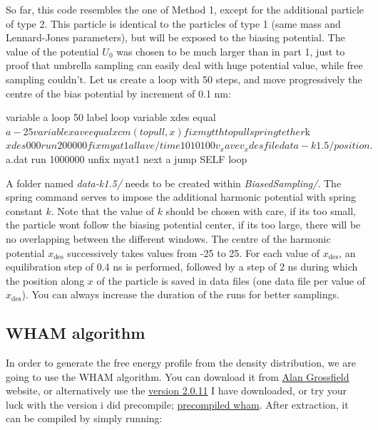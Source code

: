 \noindent So far, this code resembles the one of Method 1,
except for the additional particle of type 2. This
particle is identical to the particles of type 1 (same
mass and Lennard-Jones parameters), but will be exposed to the
biasing potential.
The value of the potential $U_0$ was chosen to be much larger than in part 1, 
just to proof that umbrella sampling can easily deal with huge potential value,
while free sampling couldn't.
Let us create a loop with 50 steps, and move progressively
the centre of the bias potential by increment of 0.1 nm:

\begin{lcverbatim}
variable a loop 50
label loop
variable xdes equal ${a}-25
variable xave equal xcm(topull,x)
fix mytth topull spring tether ${k} ${xdes} 0 0 0
run 200000
fix myat1 all ave/time 10 10 100 v_xave v_xdes file data-k1.5/position.${a}.dat
run 1000000
unfix myat1
next a
jump SELF loop
\end{lcverbatim}

\noindent A folder named \textit{data-k1.5/} needs to be created within \textit{BiasedSampling/}.
The spring command serves to impose the
additional harmonic potential with spring constant $k$.
Note that the value of $k$ should be chosen with care,
if its too small, the particle wont follow the biasing potential
center, if its too large, there will be no overlapping between the 
different windows.
The centre of the harmonic potential $x_\text{des}$
successively takes values from -25 to 25. For each value of
$x_\text{des}$, an equilibration step of 0.4 ns is
performed, followed by a step of 2 ns during which the
position along $x$ of the particle is saved in data
files (one data file per value of $x_\text{des}$). You
can always increase the duration of the runs for better samplings.

\subsection{WHAM algorithm}

\noindent In order to generate the free energy profile from the density distribution, we are going to use
the WHAM algorithm. You can download it from \href{http://membrane.urmc.rochester.edu/?page_id=126}{Alan Grossfield} website, or alternatively use 
the \href{../../../../../inputs/level3/free-energy-calculation/BiasedSampling/wham-release-2.0.11.tgz}{version 2.0.11} I have downloaded, or try your luck with the version 
i did precompile; \href{../../../../../inputs/level3/free-energy-calculation/BiasedSampling/wham}{precompiled wham}. After extraction, it can be compiled by simply running:

